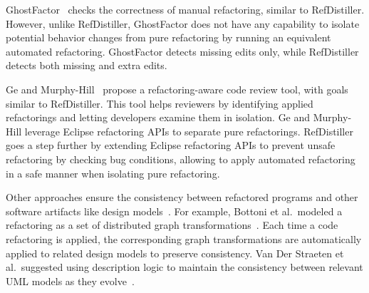 GhostFactor~\cite{geManual2014} checks the correctness of manual refactoring, similar to RefDistiller. 
However, unlike RefDistiller, GhostFactor does not have any capability to isolate potential behavior changes from pure refactoring by running an equivalent automated refactoring. GhostFactor detects missing edits only, while RefDistiller detects both missing and extra edits. 

Ge and Murphy-Hill~\cite{emersoncodereview:2014chase} propose a refactoring-aware code review tool, with goals similar to RefDistiller. This tool helps reviewers by identifying applied refactorings and letting developers examine them in isolation. Ge and Murphy-Hill leverage Eclipse refactoring APIs to separate pure refactorings. RefDistiller goes a step further by extending Eclipse refactoring APIs to prevent unsafe refactoring by checking bug conditions, allowing to apply automated refactoring in a safe manner when isolating pure refactoring. 


Other approaches ensure the consistency between refactored programs and other software artifacts like design models~\cite{Bottoni2003:coordinatedTransformation,Straeten2003:UML}. For example, Bottoni et al.~modeled a refactoring as a set of distributed graph transformations~\cite{Bottoni2003:coordinatedTransformation}. Each time a code refactoring is applied, the corresponding graph transformations are automatically applied to related design models to preserve consistency. Van Der Straeten et al.~suggested using description logic to maintain the consistency between relevant UML models as they evolve~\cite{Straeten2003:UML}.


